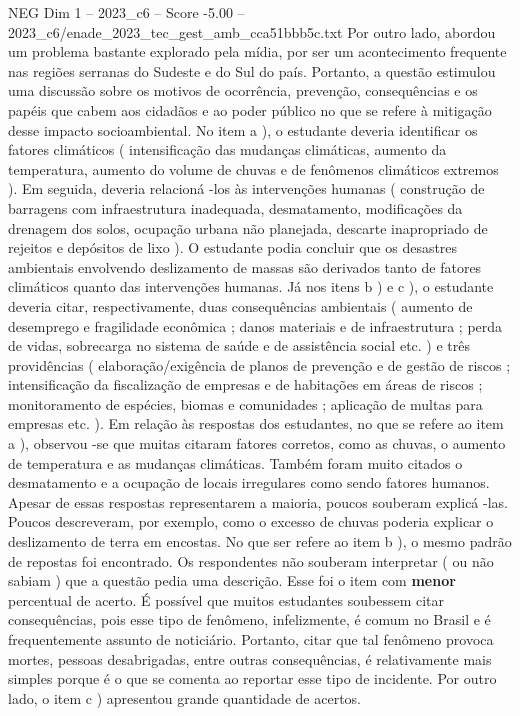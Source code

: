 \begin{textsample}{NEG Dim 1 – 2023\_c6 – Score -5.00 – 2023\_c6/enade\_2023\_tec\_gest\_amb\_cca51bbb5c.txt}
Por outro lado, abordou um problema bastante explorado pela mídia, por ser um acontecimento frequente nas regiões serranas do Sudeste e do Sul do país.
Portanto, a questão estimulou uma discussão sobre os motivos de ocorrência, prevenção, consequências e os papéis que cabem aos cidadãos e ao poder público no que se refere à mitigação desse impacto socioambiental.
No item a ), o estudante deveria identificar os fatores climáticos ( intensificação das mudanças climáticas, aumento da temperatura, aumento do volume de chuvas e de fenômenos climáticos extremos ).
Em seguida, deveria relacioná -los às intervenções humanas ( construção de barragens com infraestrutura inadequada, desmatamento, modificações da drenagem dos solos, ocupação urbana não planejada, descarte inapropriado de rejeitos e depósitos de lixo ).
O estudante podia concluir que os desastres ambientais envolvendo deslizamento de massas são derivados tanto de fatores climáticos quanto das intervenções humanas.
Já nos itens b ) e c ), o estudante deveria citar, respectivamente, duas consequências ambientais ( aumento de desemprego e fragilidade econômica ; danos materiais e de infraestrutura ; perda de vidas, sobrecarga no sistema de saúde e de assistência social etc. ) e três providências ( elaboração/exigência de planos de prevenção e de gestão de riscos ; intensificação da fiscalização de empresas e de habitações em áreas de riscos ; monitoramento de espécies, biomas e comunidades ; aplicação de multas para empresas etc. ).
Em relação às respostas dos estudantes, no que se refere ao item a ), observou -se que muitas citaram fatores corretos, como as chuvas, o aumento de temperatura e as mudanças climáticas.
Também foram muito citados o desmatamento e a ocupação de locais irregulares como sendo fatores humanos.
Apesar de essas respostas representarem a maioria, poucos souberam explicá -las.
Poucos descreveram, por exemplo, como o excesso de chuvas poderia explicar o deslizamento de terra em encostas.
No que ser refere ao item b ), o mesmo padrão de repostas foi encontrado.
Os respondentes não souberam interpretar ( ou não sabiam ) que a questão pedia uma descrição.
Esse foi o item com \textbf{menor} percentual de acerto.
É possível que muitos estudantes soubessem citar consequências, pois esse tipo de fenômeno, infelizmente, é comum no Brasil e é frequentemente assunto de noticiário.
Portanto, citar que tal fenômeno provoca mortes, pessoas desabrigadas, entre outras consequências, é relativamente mais simples porque é o que se comenta ao reportar esse tipo de incidente.
Por outro lado, o item c ) apresentou grande quantidade de acertos.

\end{textsample}
